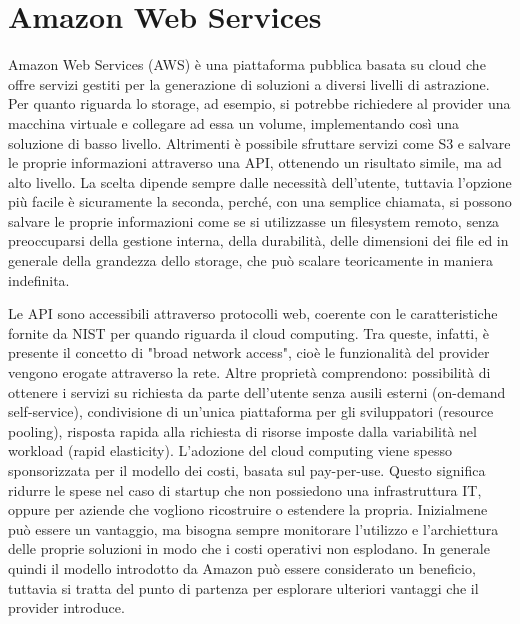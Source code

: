 \section{Amazon Web Services}
Amazon Web Services (AWS) è una piattaforma pubblica basata su cloud che offre servizi gestiti per la generazione di soluzioni a diversi livelli di astrazione. Per quanto riguarda lo storage, ad esempio, si potrebbe richiedere al provider una macchina virtuale e collegare ad essa un volume, implementando così una soluzione di basso livello. Altrimenti è possibile sfruttare servizi come S3 e salvare le proprie informazioni attraverso una API, ottenendo un risultato simile, ma ad alto livello. La scelta dipende sempre dalle necessità dell'utente, tuttavia l'opzione più facile è sicuramente la seconda, perché, con una semplice chiamata, si possono salvare le proprie informazioni come se si utilizzasse un filesystem remoto, senza preoccuparsi della gestione interna, della durabilità, delle dimensioni dei file ed in generale della grandezza dello storage, che può scalare teoricamente in maniera indefinita. %

Le API sono accessibili attraverso protocolli web, coerente con le caratteristiche fornite da NIST per quando riguarda il cloud computing. Tra queste, infatti, è presente il concetto di "broad network access", cioè le funzionalità del provider vengono erogate attraverso la rete. Altre proprietà comprendono: possibilità di ottenere i servizi su richiesta da parte dell'utente senza ausili esterni (on-demand self-service), condivisione di un'unica piattaforma per gli sviluppatori (resource pooling), risposta rapida alla richiesta di risorse imposte dalla variabilità nel workload (rapid elasticity).  
L'adozione del cloud computing viene spesso sponsorizzata per il modello dei costi, basata sul pay-per-use. Questo significa ridurre le spese nel caso di startup che non possiedono una infrastruttura IT, oppure per aziende che vogliono ricostruire o estendere la propria. Inizialmene può essere un vantaggio, ma bisogna sempre monitorare l'utilizzo e l'archiettura delle proprie soluzioni in modo che i costi operativi non esplodano. In generale quindi il modello introdotto da Amazon può essere considerato un beneficio, tuttavia si tratta del punto di partenza per esplorare ulteriori vantaggi che il provider introduce. 

